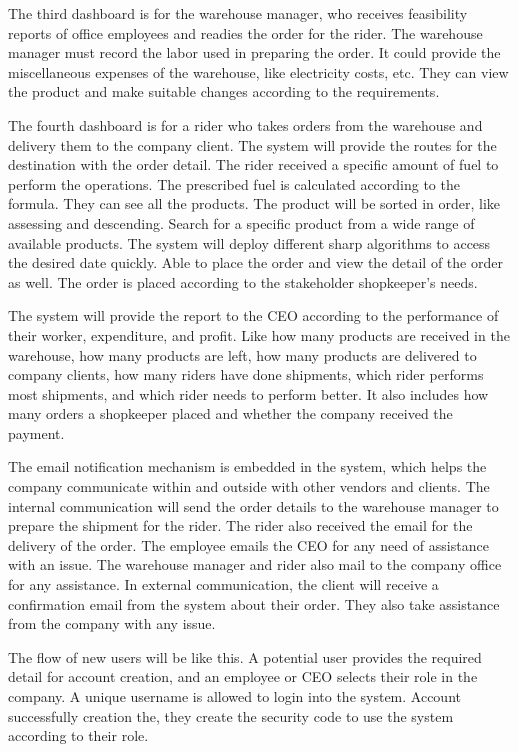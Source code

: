 \documentclass[12pt,a4paper]{report}
\begin{document}
The third dashboard is for the warehouse manager, who receives feasibility reports of office employees and readies the order for the rider. The warehouse manager must record the labor used in preparing the order. It could provide the miscellaneous expenses of the warehouse, like electricity costs, etc. They can view the product and make suitable changes according to the requirements. 
 
The fourth dashboard is for a rider who takes orders from the warehouse and delivery them to the company client. The system will provide the routes for the destination with the order detail. The rider received a specific amount of fuel to perform the operations. The prescribed fuel is calculated according to the formula. They can see all the products. The product will be sorted in order, like assessing and descending. Search for a specific product from a wide range of available products. The system will deploy different sharp algorithms to access the desired date quickly. Able to place the order and view the detail of the order as well. The order is placed according to the stakeholder shopkeeper's needs.
 
The system will provide the report to the CEO according to the performance of their worker, expenditure, and profit.
Like how many products are received in the warehouse, how many products are left, how many products are delivered to company clients, how many riders have done shipments, which rider performs most shipments, and which rider needs to perform better. It also includes how many orders a shopkeeper placed and whether the company received the payment. 
 
The email notification mechanism is embedded in the system, which helps the company communicate within and outside with other vendors and clients. The internal communication will send the order details to the warehouse manager to prepare the shipment for the rider. The rider also received the email for the delivery of the order. The employee emails the CEO for any need of assistance with an issue. The warehouse manager and rider also mail to the company office for any assistance. In external communication, the client will receive a confirmation email from the system about their order. They also take assistance from the company with any issue.
 
The flow of new users will be like this. A potential user provides the required detail for account creation, and an employee or CEO selects their role in the company. A unique username is allowed to login into the system. Account successfully creation the, they create the security code to use the system according to their role. 
 
\end{document}

